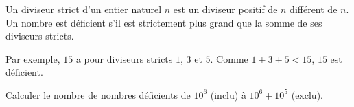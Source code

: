 Un diviseur strict d'un entier naturel $n$ est un diviseur positif de $n$ différent de $n$. Un nombre est déficient s'il est strictement plus grand que la somme de ses diviseurs stricts. 

Par exemple, $15$ a pour diviseurs stricts $1$, $3$ et $5$. Comme $1+3+5 < 15$, $15$ est déficient. 

\question{} Calculer le nombre de nombres déficients de $10^6$ (inclu) à $10^6+10^5$ (exclu).